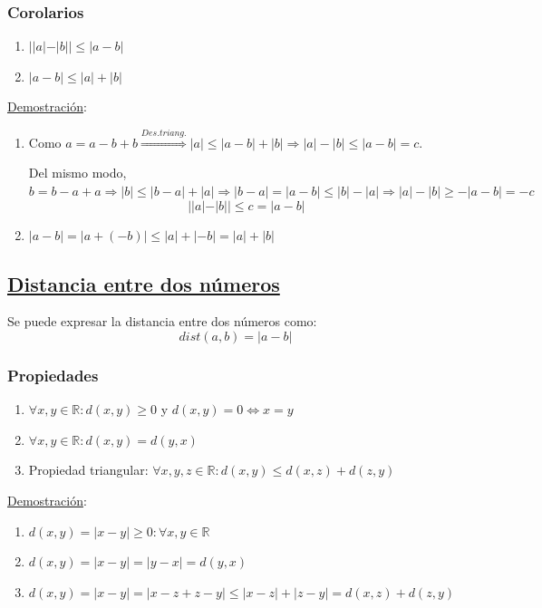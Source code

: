 \documentclass[10pt,a4paper,openright]{book}
\begin{document}
\subsubsection*{Corolarios}
\begin{enumerate}
\item $||a|-|b||\leq |a-b|$
\item $|a-b|\leq |a|+|b|$
\end{enumerate}
\underline{Demostración}:
\begin{enumerate}
\item Como $a=a-b+b\stackrel{Des.triang.}{\Rightarrow} |a|\leq |a-b|+|b|\Rightarrow |a|-|b|\leq |a-b|=c$.\par
Del mismo modo, $b=b-a+a\Rightarrow |b|\leq |b-a|+|a|\Rightarrow |b-a|=|a-b|\leq |b|-|a|\Rightarrow |a|-|b|\geq -|a-b|=-c$
$$||a|-|b||\leq c=|a-b|$$

\item $|a-b|=|a+(-b)|\leq |a|+|-b|=|a|+|b|$
\end{enumerate}

\subsection*{\underline{Distancia entre dos números}}
Se puede expresar la distancia entre dos números como:
$$dist(a,b)=|a-b|$$

\subsubsection*{Propiedades}
\begin{enumerate}
\item $\forall x,y\in \mathbb R: d(x,y)\geq 0$ y $d(x,y)=0\Leftrightarrow x=y$

\item $\forall x,y\in \mathbb R: d(x,y)=d(y,x)$

\item Propiedad triangular: $\forall x,y,z\in \mathbb R : d(x,y)\leq d(x,z)+d(z,y)$
\end{enumerate}

\underline{Demostración}:
\begin{enumerate}
\item $d(x,y)=|x-y|\geq 0 : \forall x,y\in \mathbb R$

\item $d(x,y)=|x-y|=|y-x|=d(y,x)$

\item $d(x,y)=|x-y|=|x-z+z-y|\leq |x-z|+|z-y|=d(x,z)+d(z,y)$
\end{enumerate}
\end{document}
